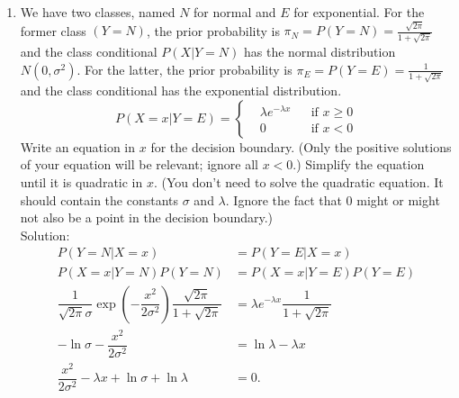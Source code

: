 \documentclass[10pt]{article}
\begin{document}
\begin{enumerate}[1.]
    \item  We have two classes, named $N$ for normal and $E$ for exponential. For the former class $(Y=N)$, the prior probability is $\pi_N = P(Y=N) = \frac{\sqrt{2\pi}}{1+\sqrt{2\pi}}$ and the class conditional $P(X|Y=N)$ has the normal distribution $N(0,\sigma^2)$. For the latter, the prior probability is $\pi_E = P(Y=E) = \frac{1}{1+\sqrt{2\pi}}$ and the class conditional has the exponential distribution.
          $$ P(X=x|Y=E)=\left\{
              \begin{aligned}
                   & \lambda e^{-\lambda x} &  & \text{if } x\geq 0 \\
                   & 0                      &  & \text{if } x< 0
              \end{aligned}
              \right.
          $$
          Write an equation in $x$ for the decision boundary. (Only the positive solutions of your equation will be relevant;
          ignore all $x < 0$.) Simplify the equation until it is quadratic in $x$. (You don’t need to solve
          the quadratic equation. It should contain the constants $\sigma$ and $\lambda$. Ignore the fact that 0 might or might not also be
          a point in the decision boundary.) ~ \\
          {\color{blue} Solution:
          \begin{align*}
              P(Y=N|X=x)                                                                                  & = P(Y=E|X=x)                                     \\
              P(X=x|Y=N)P(Y=N)                                                                            & = P(X=x|Y=E)P(Y=E)                               \\
              \dfrac{1}{\sqrt{2\pi}\sigma}\exp(-\dfrac{x^2}{2\sigma^2})\dfrac{\sqrt{2\pi}}{1+\sqrt{2\pi}} & = \lambda e^{-\lambda x}\dfrac{1}{1+\sqrt{2\pi}} \\
              -\ln \sigma -\dfrac{x^2}{2\sigma^2}                                                         & = \ln\lambda-\lambda x                           \\
              \dfrac{x^2}{2\sigma^2}-\lambda x+\ln \sigma+\ln \lambda                                     & =0.
          \end{align*}
          }



\end{enumerate}
\end{document}
